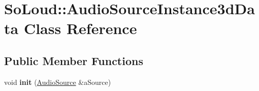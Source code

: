 \hypertarget{class_so_loud_1_1_audio_source_instance3d_data}{}\section{So\+Loud\+:\+:Audio\+Source\+Instance3d\+Data Class Reference}
\label{class_so_loud_1_1_audio_source_instance3d_data}
\subsection*{Public Member Functions}
\begin{DoxyCompactItemize}
\item 
\mbox{\label{class_so_loud_1_1_audio_source_instance3d_data_a358f5377c312eb39cf17561a8de71b75}} 
void {\bfseries init} (\mbox{\hyperlink{class_so_loud_1_1_audio_source}{Audio\+Source}} \&a\+Source)
\end{DoxyCompactItemize}
